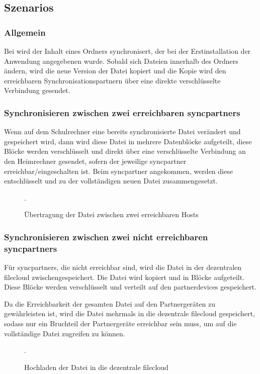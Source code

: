 \subsection{Szenarios}
\subsubsection{Allgemein}
Bei \sblit wird der Inhalt eines Ordners synchronisert, der bei der
Erstinstallation der Anwendung angegebenen wurde. Sobald sich Dateien innerhalb des Ordners
ändern, wird die neue Version der Datei kopiert und die Kopie wird den
erreichbaren Synchronisationspartnern über eine direkte verschlüsselte Verbindung
gesendet.

\subsubsection{Synchronisieren zwischen zwei erreichbaren \glspl{syncpartner}}
Wenn auf dem Schulrechner eine bereits synchronisierte Datei verändert und
gespeichert wird, dann wird diese Datei in mehrere Datenblöcke
aufgeteilt, diese Blöcke werden verschlüsselt und direkt über eine verschlüsselte
Verbindung an den Heimrechner gesendet, sofern der jeweilige \gls{syncpartner}
erreichbar/eingeschalten ist. Beim \gls{syncpartner} angekommen, werden diese
entschlüsselt und zu der vollständigen neuen Datei zusammengesetzt.

\begin{figure}[h]
	\centering
  
  \caption{Übertragung der Datei zwischen zwei erreichbaren Hosts}.
\end{figure}

\subsubsection{Synchronisieren zwischen zwei nicht erreichbaren \glspl{syncpartner}}
Für \glspl{syncpartner}, die nicht erreichbar sind, wird die Datei in der dezentralen
\gls{filecloud} zwischengespeichert. Die Datei wird kopiert und in Blöcke
aufgeteilt. Diese Blöcke werden verschlüsselt und verteilt auf den
\glspl{partnerdevice} gespeichert.

Da die Erreichbarkeit der gesamten Datei auf den Partnergeräten zu gewährleisten
ist, wird die Datei mehrmals
in die dezentrale \gls{filecloud} gespeichert, sodass nur ein Bruchteil der
Partnergeräte erreichbar sein muss, um auf die vollständige Datei zugreifen zu
können.

\begin{figure}[h]
	\centering
  
  \caption{Hochladen der Datei in die dezentrale \gls{filecloud}}.
\end{figure}

